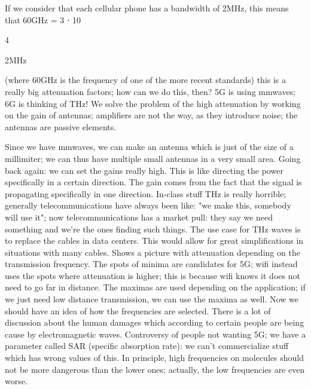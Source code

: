 {{{If we consider that each cellular phone has a bandwidth of 2MHz, this means that 60GHz
= 3 ⋅ 10

4

2MHz

(where 60GHz is the frequency of one of the more recent standards) this is a really big attenuation factors; how can we do this, then? 5G is using mmwaves; 6G is thinking of THz! We solve the problem of the high attenuation by working on the gain of antennas;
amplifiers are not the way, as they introduce noise; the antennas are passive elements.

Since we have mmwaves, we can make an antenna which is just of the size of a millimiter; we can thus have multiple small antennas in a very small area.
Going back again: we can set the gains really high. This is like directing the power specifically in a certain direction.
The gain comes from the fact that the signal is propagating specifically in one direction.
In-class stuff THz is really horrible; generally telecommunications have always been like: "we make this, somebody will use it"; now telecommunications has a market pull: they say we need something and we're the ones finding such things.
The use case for THz waves is to replace the cables in data centers. This would allow for great simplifications in situations with many cables.
Shows a picture with attenuation depending on the transmission frequency.
The spots of minima are candidates for 5G; wifi instead uses the spots where attenuation is higher; this is because wifi knows it does not need to go far in distance.
The maximas are used depending on the application; if we just need low distance transmission, we can use the maxima as well.
Now we should have an idea of how the frequencies are selected. There is a lot of discussion about the human damages which according to certain people are being cause by electromagnetic waves.
Controversy of people not wanting 5G; we have a parameter called SAR (specific absorption rate): we can't commercialize stuff which has wrong values of this.
In principle, high frequencies on molecules should not be more dangerous than the lower ones; actually, the low frequencies are even worse.

}}}
